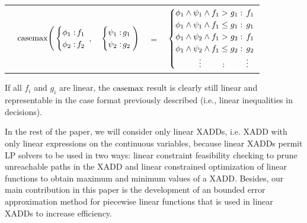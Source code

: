 \vspace{-5mm}
{\footnotesize
\begin{center}
\begin{tabular}{r c c c l}
&
\hspace{-7mm} $\casemax \Bigg(
  \begin{cases}
    \phi_1: \hspace{-2mm} & \hspace{-1mm} f_1 \\ 
    \phi_2: \hspace{-2mm} & \hspace{-1mm} f_2 \\ 
  \end{cases}$
$,$
&
\hspace{-4mm}
  $\begin{cases}
    \psi_1: \hspace{-2mm} & \hspace{-1mm} g_1 \\ 
    \psi_2: \hspace{-2mm} & \hspace{-1mm} g_2 \\ 
  \end{cases} \Bigg)$
&
\hspace{-4mm} 
$ = $
&
\hspace{-4mm}
  $\begin{cases}
  \phi_1 \wedge \psi_1 \wedge f_1 > g_1    : & \hspace{-2mm} f_1 \\ 
  \phi_1 \wedge \psi_1 \wedge f_1 \leq g_1 : & \hspace{-2mm} g_1 \\ 
  \phi_1 \wedge \psi_2 \wedge f_1 > g_2    : & \hspace{-2mm}f_1 \\ 
  \phi_1 \wedge \psi_2 \wedge f_1 \leq g_2 : & \hspace{-2mm} g_2 \\ 
  \hspace{1cm}\vdots \hspace{8mm}: & \hspace{-2mm} \vdots
  \end{cases}$
\end{tabular}
\end{center}
\vspace{-3mm}
} If all $f_i$ and $g_i$ are linear,
the $\mathrm{casemax}$ result is clearly still linear and representable in the case format previously described (i.e., linear inequalities in decisions).

In the rest of the paper, we will consider only linear XADDs, i.e. XADD with only linear expressions on the continuous variables, because linear XADDs permit LP solvers to be used in two ways: linear constraint feasibility checking to prune unreachable paths in the XADD and linear constrained optimization of linear functions to obtain maximum and minimum values of a XADD. Besides, our main contribution in this paper is the development of an bounded error approximation method for piecewise linear functions that is used in linear XADDs to increase efficiency.
